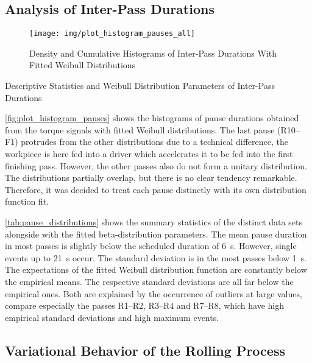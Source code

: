 \subsection{Analysis of Inter-Pass Durations}\label{subsec:analysis-of-inter-pass-durations}

\begin{figure}
    \centering
    \texttt{[image: img/plot\_histogram\_pauses\_all]}
    \caption{Density and Cumulative Histograms of Inter-Pass Durations With Fitted Weibull Distributions}
    \label{fig:plot_histogram_pauses}
\end{figure}

\begin{table}
    \centering
    \caption{Descriptive Statistics and Weibull Distribution Parameters of Inter-Pass Durations}
    \label{tab:pause_distributions}
    
\end{table}


\autoref{fig:plot_histogram_pauses} shows the histograms of pause durations obtained from the torque signals with fitted Weibull distributions.
The last pause (R10--F1) protrudes from the other distributions due to a technical difference, the workpiece is here fed into a driver which accelerates it to be fed into the first finishing pass.
However, the other passes also do not form a unitary distribution.
The distributions partially overlap, but there is no clear tendency remarkable.
Therefore, it was decided to treat each pause distinctly with its own distribution function fit.

\autoref{tab:pause_distributions} shows the summary statistics of the distinct data sets alongside with the fitted beta-distribution parameters.
The mean pause duration in most passes is slightly below the scheduled duration of \qty{6}{\second}.
However, single events up to \qty{21}{\second} occur.
The standard deviation is in the most passes below \qty{1}{\second}.
The expectations of the fitted Weibull distribution function are constantly below the empirical means.
The respective standard deviations are all far below the empirical ones.
Both are explained by the occurrence of outliers at large values, compare especially the passes R1--R2, R3--R4 and R7--R8, which have high empirical standard deviations and high maximum events.

\subsection{Variational Behavior of the Rolling Process}\label{subsec:variational-behavior-of-the-rolling-process}

